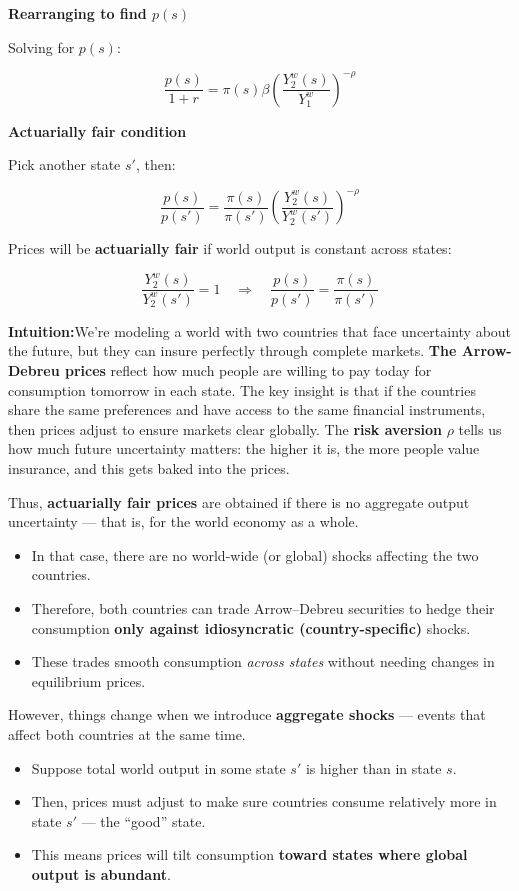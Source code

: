 \documentclass[12pt]{article}
\begin{document}
\textbf{Rearranging to find $p(s)$}

Solving for $p(s)$:

\[
\frac{p(s)}{1 + r} = \pi(s) \beta \left( \frac{Y_2^w(s)}{Y_1^w} \right)^{-\rho} \tag{19}
\]

\textbf{Actuarially fair condition}

Pick another state $s'$, then:

\[
\frac{p(s)}{p(s')} = \frac{\pi(s)}{\pi(s')} \left( \frac{Y_2^w(s)}{Y_2^w(s')} \right)^{-\rho} \tag{21}
\]

Prices will be \textbf{actuarially fair} if world output is constant across states:

\[
\frac{Y_2^w(s)}{Y_2^w(s')} = 1 \quad \Rightarrow \quad \frac{p(s)}{p(s')} = \frac{\pi(s)}{\pi(s')}
\]

\vspace{0.5cm}

{\textbf{Intuition:}}We’re modeling a world with two countries that face uncertainty about the future, but they can insure perfectly through complete markets. \textbf{The Arrow-Debreu prices} reflect how much people are willing to pay today for consumption tomorrow in each state. The key insight is that if the countries share the same preferences and have access to the same financial instruments, then prices adjust to ensure markets clear globally. The \textbf{risk aversion} $\rho$ tells us how much future uncertainty matters: the higher it is, the more people value insurance, and this gets baked into the prices.

Thus, \textbf{actuarially fair prices} are obtained if there is no aggregate output uncertainty — that is, for the world economy as a whole.

\begin{itemize}
    \item In that case, there are no world-wide (or global) shocks affecting the two countries.
    \item Therefore, both countries can trade Arrow–Debreu securities to hedge their consumption \textbf{only against idiosyncratic (country-specific)} shocks.
    \item These trades smooth consumption \textit{across states} without needing changes in equilibrium prices.
\end{itemize}

However, things change when we introduce \textbf{aggregate shocks} — events that affect both countries at the same time.

\begin{itemize}
    \item Suppose total world output in some state $s'$ is higher than in state $s$. 
    \item Then, prices must adjust to make sure countries consume relatively more in state $s'$ — the “good” state.
    \item This means prices will tilt consumption \textbf{toward states where global output is abundant}.
\end{itemize}
\end{document}
